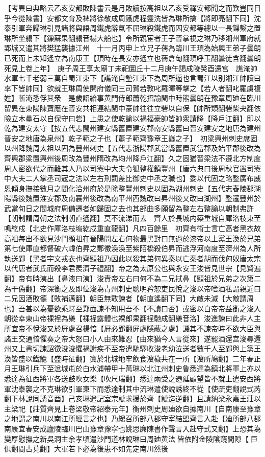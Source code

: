 【考異曰典略云乙亥安都敗陳書云是月敗續按高祖以乙亥受禪安都聞之而歎豈同日乎今從陳書】安都文育及裨將徐敬成周鐵虎程靈洗皆為琳所擒【將即亮翻下同】沈泰引軍奔歸琳引見諸將與語周鐵虎辭氣不屈琳殺鐵虎而囚安都等總以一長鏁繫之置琳所坐䑽下【鏁蘇果翻䑽音榻大船也】令所親宦者王子晉掌視之琳乃移湘州軍府就郢城又遣其將樊猛襲據江州　十一月丙申上立兄子蒨為臨川王頊為始興王弟子曇朗已死而上未知遙立為南康王【頊時在長安亦遙立也蒨倉甸翻頊呼玉翻曇徒含翻曇朗死見上卷上年】　庚子周王享太廟丁未祀圜丘十二月庚午謁成陵癸酉還宫　譙淹帥水軍七千老弱三萬自蜀江東下【譙淹自墊江東下為周所逼也言蜀江以别湘江帥讀曰率下皆帥同】欲就王琳周使開府儀同三司賀若敦叱羅暉等擊之【若人者翻叱羅虜複姓】斬淹悉俘其衆　是歲詔給事黄門侍郎蕭乾招諭閩中時熊曇朗在豫章周廸在臨川留異在東陽陳寶應在晉安共相連結閩中豪帥往往立砦以自保【帥所類翻砦柴夬翻依險立木壘石以自保守曰砦】上患之使乾諭以禍福豪帥皆帥衆請降【降戶江翻】即以乾為建安太守【按五代志閩州建安縣舊置建安郡南安縣舊曰晉安建安之地唐為建州晉安之地唐為泉州】乾子範之子也【蕭子範齊豫章王嶷之子】　初梁興州刺史席固以州降魏周太祖以固為豐州刺史【五代志浙陽郡武當縣舊置武當郡及始平郡後改為齊興郡梁置興州後周改為豐州隋改為均州降戶江翻】久之固猶習梁法不遵北方制度周人密欲代之而難其人乃以司憲中大夫令狐整權鎮豐州【唐六典曰後周秋官置司憲中大夫二人掌丞司宼之法以左右刑罰盖比御史中丞之職也】委以代固之略整廣布威恩傾身撫接數月之間化洽州府於是除整豐州刺史以固為湖州刺史【五代志舂陵郡湖陽縣後魏置淮安郡及南襄州後改為南平州西魏改曰昇州後又改曰湖州】整遷豐州於武當旬日之間城府周備遷者如歸固之去也其部曲多願留為整左右整諭以朝制弗許【朝制謂周朝之法制朝直遙翻】莫不流涕而去　齊人於長城内築重城自庫洛枝東至鳴紇戍【北史作庫洛枝塢紇戍重直龍翻】凡四百餘里　初齊有術士言亡高者黑衣故高祖每出不欲見沙門顯祖在晉陽問左右何物最黑對曰無過於漆帝以上黨王渙於兄弟第七使庫直都督破六韓伯昇之鄴徵渙渙至紫陌橋殺伯昇而逃浮河南度至濟州為人所執送鄴【黑者宇文戎衣也齊顯祖乃因此以殺其弟何異秦以亡秦者胡而伐匈奴唐太宗以代唐者武氏而殺李君羨濟子禮翻】帝之為太原公也與永安王浚皆見世宗【見賢遍翻】帝有時洟出【鼻液曰洟】浚責帝左右曰何不為二兄拭鼻【顯祖於兄弟之次第二為干偽翻】帝深銜之及即位浚為青州刺史聰明矜恕吏民悅之浚以帝嗜酒私謂親近曰二兄因酒敗德【敗補邁翻】朝臣無敢諫者【朝直遙翻下同】大敵未滅【大敵謂周也】吾甚以為憂欲乘驛至鄴面諫不知用吾不【不讀曰否】或密以白帝帝益銜之浚入朝從幸東山帝裸裎為樂【裸裎露體也裸郎果翻䄇馳成翻樂音洛】浚進諫曰此非人主所宜帝不悅浚又於屛處召楊愔【屛必郢翻屛處隱蔽之處】譏其不諫帝時不欲大臣與諸王交通愔懼奏之帝大怒曰小人由來難忍【由來猶今人言從來】遂罷酒還宫浚尋還州又上書切諫詔徵浚浚懼禍謝疾不至帝遣馳驛收浚老幼泣送者數千人至鄴與上黨王渙皆盛以鐵籠【盛時征翻】寘於北城地牢飲食溲穢共在一所【溲所鳩翻】二年春正月王琳引兵下至湓城屯於白水浦帶甲十萬琳以北江州刺史魯悉達為鎮北將軍上亦以悉達為征西將軍各送鼓吹女樂【吹尺瑞翻】悉達兩受之遷延顧望皆不就上遣安西將軍沈泰襲之不克琳欲引軍東下而悉達制其中流琳遣使說誘終不從【使疏吏翻說式芮翻下林說同誘音酉】己亥琳遣記室宗虩求援於齊【虩迄逆翻】且請納梁永嘉王莊以主梁祀【莊質齊見上卷梁敬帝紹泰元年】衡州刺史周廸欲自據南川【自南康至豫章之地謂之南川以南江所經言之也】乃總召所部八郡守宰結盟齊言入赴【廸所部八郡南康宜春安成廬陵臨川巴山豫章豫寜也姚思廉陳書作聲言入赴守式又翻】上恐其為變厚慰撫之新吳洞主余孝頃遣沙門道林說琳曰周廸黄法皆依附金陵隂窺間隙【巨俱翻間古莧翻】大軍若下必為後患不如先定南川然後